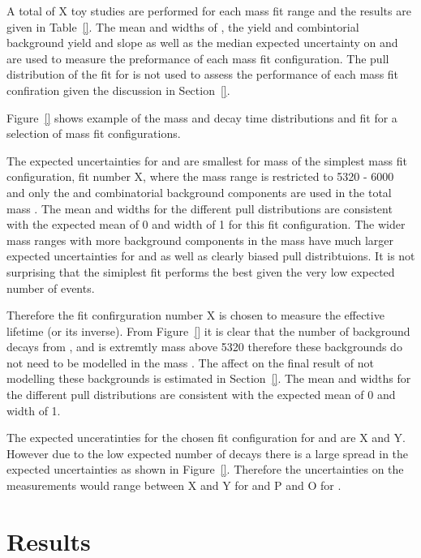 {A total of X toy studies are performed for each mass fit range and the results are given in Table~\ref{}. The mean and widths of \Gmumu, the \bsmumu yield and combintorial background yield and slope as well as the median expected uncertainty on \tmumu and \Gmumu are used to measure the preformance of each mass fit configuration. The pull distribution of the fit for \tmumu is not used to assess the performance of each mass fit confiration given the discussion in Section~\ref{}.

Figure~\ref{} shows example of the mass and decay time distributions and \ml fit for a selection of mass fit configurations. 

The expected uncertainties for \tmumu and \Gmumu are smallest for mass of the simplest mass fit configuration, fit number X, where the mass range is restricted to 5320 - 6000 \mevcc and only the \bsmumu and combinatorial background components are used in the total mass \pdf. The mean and widths for the different pull distributions are consistent with the expected mean of 0 and width of 1 for this fit configuration. The wider mass ranges with more background components in the mass \pdf have much larger expected uncertainties for \tmumu and \Gmumu as well as clearly biased pull distribtuions. It is not surprising that the simiplest fit performs the best given the very low expected number of events. 

Therefore the fit confirguration number X is chosen to measure the \bsmumu effective lifetime (or its inverse). From Figure~\ref{} it is clear that the number of background decays from \bdmumu, \bhh and \lambdab is extremtly mass above 5320 \mevcc therefore these backgrounds do not need to be modelled in the mass \pdf. The affect on the final result of not modelling these backgrounds is estimated in Section~\ref{}. The mean and widths for the different pull distributions are consistent with the expected mean of 0 and width of 1. 


The expected unceratinties for the chosen fit configuration for \tmumu and \Gmumu are X and Y. However due to the low expected number of decays there is a large spread in the expected uncertainties as shown in Figure~\ref{}. Therefore the uncertainties on the measurements would range between X and Y for \tmumu and P and O for \Gmumu.


\section{Results}
\label{sec:ELresults}

}
